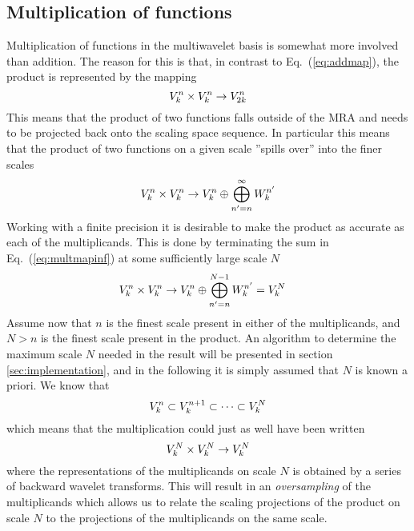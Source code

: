 \subsection{Multiplication of functions}
Multiplication of functions in the multiwavelet basis is somewhat more
involved than addition. The reason for this is that, in contrast to
Eq.~(\ref{eq:addmap}), the product is represented by the mapping \cite{Beylkin92}
\begin{equation}
    \label{eq:multmap}
    {V}_{k}^{n} \times {V}_{k}^{n} \rightarrow V^n_{2k}
\end{equation}
This means that the product of two functions falls outside of the MRA and needs 
to be projected back onto the scaling space sequence. In particular this means that 
the product of two functions on a given scale ''spills over'' into the finer scales
\begin{equation}
    \label{eq:multmapinf}
    {V}_{k}^{n} \times {V}_{k}^{n} \rightarrow {V}_{k}^{n} \oplus 
	\bigoplus_{n'=n}^{\infty} {W}_{k}^{n'}
\end{equation}
Working with a finite precision it is desirable to make the product as accurate
as each of the multiplicands. This is done by terminating the sum in
Eq.~(\ref{eq:multmapinf}) at some sufficiently large scale $N$
\begin{align}
    \label{eq:multmapN}
    {V}_{k}^{n} \times {V}_{k}^{n} \rightarrow {V}_{k}^{n} \oplus 
	\bigoplus_{n'=n}^{N-1} {W}_{k}^{n'} &= {V}_{k}^{N}
\end{align}
Assume now that $n$ is the finest scale present in either of the multiplicands,
and $N>n$ is the finest scale present in the product. An algorithm to determine 
the maximum scale $N$ needed in the result will be presented in section 
\ref{sec:implementation}, and in the following it is simply assumed that $N$ is 
known a priori. We know that
\begin{equation}
    {V}_{k}^{n} \subset {V}_{k}^{n+1} \subset \cdots \subset {V}_{k}^{N}
\end{equation}
which means that the multiplication could just as well have been written 
\begin{equation}
    {V}_{k}^{N} \times {V}_{k}^{N} \rightarrow {V}_{k}^{N}
\end{equation}
where the representations of the multiplicands on scale $N$ is obtained by a
series of backward wavelet transforms. This will result in an \emph{oversampling} 
of the multiplicands which allows us to relate the scaling projections of the product
on scale $N$ to the projections of the multiplicands on the same scale.

